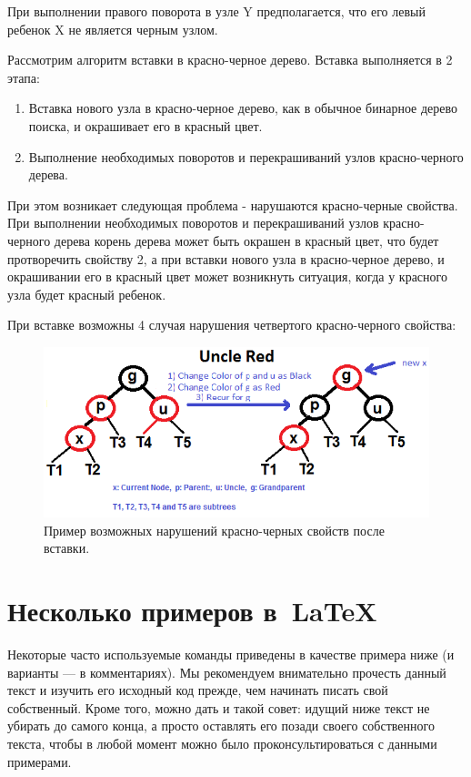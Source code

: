 	При выполнении правого поворота в узле Y предполагается, что
	его левый ребенок X не является черным узлом.

Рассмотрим алгоритм вставки в красно-черное дерево. Вставка выполняется в 2 этапа:
\begin{enumerate}
	\item Вставка нового узла в красно-черное дерево, как в обычное бинарное
		  дерево поиска, и окрашивает его в красный цвет.
	\item Выполнение необходимых поворотов и перекрашиваний узлов 
		  красно-черного дерева.
\end{enumerate}

При этом возникает следующая проблема - нарушаются красно-черные свойства.
При выполнении необходимых поворотов и перекрашиваний узлов красно-черного 
дерева корень дерева может быть окрашен в красный цвет, что будет протворечить
свойству 2, а при вставки нового узла в красно-черное дерево, и окрашивании
его в красный цвет может возникнуть ситуация, когда у красного узла будет 
красный ребенок.

При вставке возможны 4 случая нарушения четвертого красно-черного свойства:
\begin{figure}[H]
\centering
\includegraphics[width=\textwidth]{img/tan-aus.png}
\caption{Пример возможных нарушений красно-черных свойств после вставки.}
\end{figure}  



\section{Несколько примеров в~\LaTeX{}}
\label{sec:examples}

Некоторые часто используемые
команды приведены в качестве примера ниже (и варианты — в
комментариях). Мы рекомендуем внимательно прочесть данный
текст и изучить его исходный код прежде, чем начинать писать
свой собственный. Кроме того, можно дать и такой совет: идущий
ниже текст не убирать до самого конца, а просто оставлять его
позади своего собственного текста, чтобы в любой момент можно
было проконсультироваться с данными примерами.

